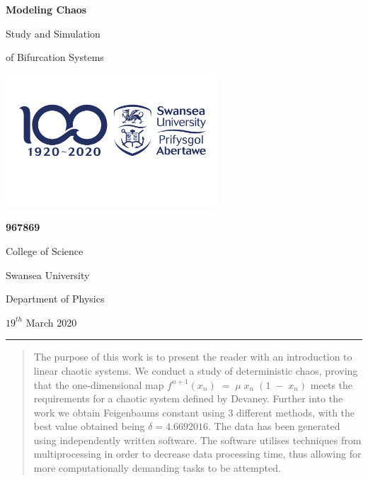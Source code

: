 \begin{titlepage}
    \begin{center}
        \vspace*{0.5in}
        
        \Huge
        \textbf{Modeling Chaos}
        
        Study and Simulation 
        
        of Bifurcation Systems
        
        
        \vspace*{0.7in}
        \includegraphics[width=0.6\textwidth]{Images/sulogo.png}
        
        
        \vspace*{0.5in}
        \LARGE
        \textbf{967869}
        
        \vspace*{0.2in}
        College of Science
        
        Swansea University
        
        
        
        \vfill
        \normalsize
        \begin{multicols}{2}
        Department of Physics
        
        \columnbreak
        
        $19^{th}$ March 2020
        \end{multicols}
    \end{center}
    \hrule
    
    
    \begin{abstract}
    \begin{center}
        The purpose of this work is to present the reader with an introduction to 
        linear chaotic systems. We conduct a study of deterministic chaos, proving that the one-dimensional map
        $f^{n+1}(x_n)\;=\;\mu\; x_n\; (1\;-\;x_n)$
        meets the requirements for a chaotic system defined by Devaney. Further into the work we obtain Feigenbaums constant
        using 3 different methods, with the best value obtained being $\delta = 4.6692016$. The data has been generated using
        independently written software. The software utilises techniques from multiprocessing in order to decrease data processing
        time, thus allowing for more computationally demanding tasks to be attempted.
    \end{center}
    \end{abstract}
    
    
    
\end{titlepage}
